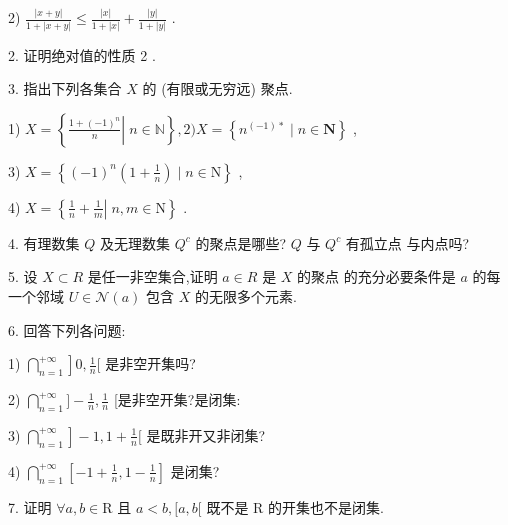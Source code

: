 2) $\frac{\left| x + y\right| }{1 + \left| {x + y}\right| } \leq  \frac{\left| x\right| }{1 + \left| x\right| } + \frac{\left| y\right| }{1 + \left| y\right| }$ .

2. 证明绝对值的性质 2 .

3. 指出下列各集合 $X$ 的 (有限或无穷远) 聚点.

1) $X = \left\{  {\left. \frac{1 + {\left( -1\right) }^{n}}{n}\right| \;n \in  \mathbb{N}}\right\}  ,2)X = \left\{  {{n}^{\left( {-1}\right)  * } \mid  n \in  \mathbf{N}}\right\}$ ,

3) $X = \left\{  {{\left( -1\right) }^{n}\left( {1 + \frac{1}{n}}\right)  \mid  n \in  \mathrm{N}}\right\}$ ,

4) $X = \left\{  {\left. {\frac{1}{n} + \frac{1}{m}}\right| \;n,m \in  \mathrm{N}}\right\}$ .

4. 有理数集 $Q$ 及无理数集 ${Q}^{c}$ 的聚点是哪些? $Q$ 与 ${Q}^{c}$ 有孤立点 与内点吗?

5. 设 $X \subset  R$ 是任一非空集合,证明 $a \in  R$ 是 $X$ 的聚点 的充分必要条件是 $a$ 的每一个邻域 $U \in  \mathcal{N}\left( a\right)$ 包含 $X$ 的无限多个元素.

6. 回答下列各问题:

1) $\left. \mathop{\bigcap }\limits_{{n = 1}}^{{+\infty }}\right\rbrack  0,\frac{1}{n}\lbrack$ 是非空开集吗?

2) $\mathop{\bigcap }\limits_{{n = 1}}^{{+\infty }}\rbrack  - \frac{1}{n},\frac{1}{n}$ [是非空开集?是闭集:

3) $\left. \mathop{\bigcap }\limits_{{n = 1}}^{{+\infty }}\right\rbrack   - 1,1 + \frac{1}{n}\lbrack$ 是既非开又非闭集?

4) $\mathop{\bigcap }\limits_{{n = 1}}^{{+\infty }}\left\lbrack  {-1 + \frac{1}{n},1 - \frac{1}{n}}\right\rbrack$ 是闭集?

7. 证明 $\forall a,b \in  \mathrm{R}$ 且 $a < b,\lbrack a,b\lbrack$ 既不是 $\mathrm{R}$ 的开集也不是闭集.